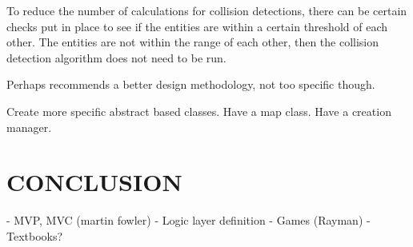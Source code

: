 \documentclass[10pt,twocolumn]{witseiepaper}
\begin{document}
To reduce the number of calculations for collision detections, there can be certain checks put in place to see if the entities are within a certain threshold of each other. The entities are not within the range of each other, then the collision detection algorithm does not need to be run.

Perhaps recommends a better design methodology, not too specific though.

Create more specific abstract based classes.
Have a map class.
Have a creation manager.

%
\section{CONCLUSION}


\balance

%



- MVP, MVC (martin fowler)
- Logic layer definition
- Games (Rayman)
- Textbooks?
\end{document}

